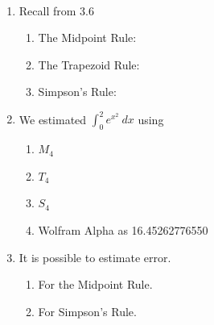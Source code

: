 \documentclass[11pt,fleqn]{article}
\begin{document}
\renewcommand{\headrulewidth}{0pt}
\newcommand{\blank}[1]{\rule{#1}{0.75pt}}
\newcommand{\bc}{\begin{center}}
\newcommand{\ec}{\end{center}}
\renewcommand{\d}{\displaystyle}

\vspace*{-0.7in}

\begin{center}
  \large
  \\
   
\end{center}

\begin{enumerate}
\item Recall from 3.6
	\begin{enumerate}
	\item The Midpoint Rule:\\
	\vfill
	\item The Trapezoid Rule:\\
	\vfill 
	\item Simpson's Rule:\\
	\vfill
	\end{enumerate}
\item We estimated {\large{$\displaystyle{\int_0^2 e^{x^2} \: dx }$}} using
	\begin{enumerate}
	\item $M_4$
	\vfill
	\item $T_4$
	\vfill
	\item $S_4$
	\vfill
	\item Wolfram Alpha as 16.45262776550
	\vfill
	\end{enumerate}
\newpage

\item It is possible to estimate error. 
	\begin{enumerate}
	\item For the Midpoint Rule. \\
	\vfill
	\item For Simpson's Rule. \\
	\vfill
	\end{enumerate}
\end{enumerate}
\end{document}
